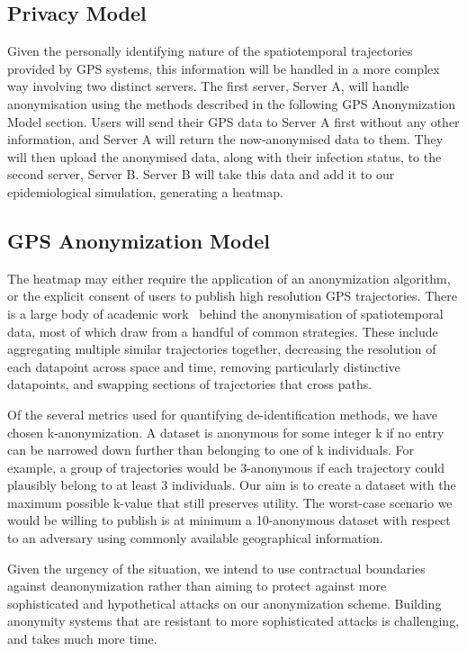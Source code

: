 \documentclass[11pt]{article}
\begin{document}
\subsection{Privacy Model}


Given the personally identifying nature of the spatiotemporal trajectories provided by GPS systems, this information will be handled in a more complex way involving two distinct servers.
The first server, Server A, will handle anonymisation using the methods described in the following GPS Anonymization Model section. Users will send their GPS data to Server A first without any other information, and Server A will return the now-anonymised data to them.
They will then upload the anonymised data, along with their infection status, to the second server, Server B. Server B will take this data and add it to our epidemiological simulation, generating a heatmap.


\subsection{GPS Anonymization Model}

The heatmap may either require the application of an anonymization algorithm, or the explicit consent of users to publish high resolution GPS trajectories. There is a large body of academic work~\cite{Primault_2019} behind the anonymisation of spatiotemporal data, most of which draw from a handful of common strategies. These include aggregating multiple similar trajectories together, decreasing the resolution of each datapoint across space and time, removing particularly distinctive datapoints, and swapping sections of trajectories that cross paths.


Of the several metrics used for quantifying de-identification methods, we have chosen k-anonymization. A dataset is anonymous for some integer k if no entry can be narrowed down further than belonging to one of k individuals. For example, a group of trajectories would be 3-anonymous if each trajectory could plausibly belong to at least 3 individuals. Our aim is to create a dataset with the maximum possible k-value that still preserves utility. The worst-case scenario we would be willing to publish is at minimum a 10-anonymous dataset with respect to an adversary using commonly available geographical information. 


Given the urgency of the situation, we intend to use contractual boundaries against deanonymization rather than aiming to protect against more sophisticated and hypothetical attacks on our anonymization scheme. Building anonymity systems that are resistant to more sophisticated attacks is challenging, and takes much more time.
\end{document}
